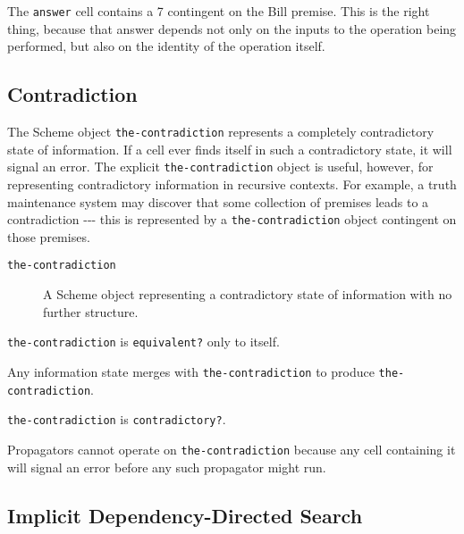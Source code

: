 \documentclass[12pt,letterpaper,english]{article}
\begin{document}
The \texttt{answer} cell contains a 7 contingent on the Bill premise.  This
is the right thing, because that answer depends not only on the inputs
to the operation being performed, but also on the identity of the
operation itself.



\hypertarget{contradiction}{}
\subsection{Contradiction}
\label{contradiction}

The Scheme object \texttt{the-contradiction} represents a completely
contradictory state of information.  If a cell ever finds itself in
such a contradictory state, it will signal an error.  The
explicit \texttt{the-contradiction} object is useful, however, for
representing contradictory information in recursive contexts.  For
example, a truth maintenance system may discover that some collection
of premises leads to a contradiction -{}-{}- this is represented by a
\texttt{the-contradiction} object contingent on those premises.
\begin{description}
\item[{\texttt{the-contradiction}}] \leavevmode 
A Scheme object representing a contradictory state of information
with no further structure.

\end{description}

\texttt{the-contradiction} is \texttt{equivalent?} only to itself.

Any information state merges with \texttt{the-contradiction} to produce
\texttt{the-contradiction}.

\texttt{the-contradiction} is \texttt{contradictory?}.

Propagators cannot operate on \texttt{the-contradiction} because any cell
containing it will signal an error before any such propagator might
run.



\hypertarget{implicit-dependency-directed-search}{}
\subsection{Implicit Dependency-Directed Search}
\label{implicit-dependency-directed-search}
\end{document}
